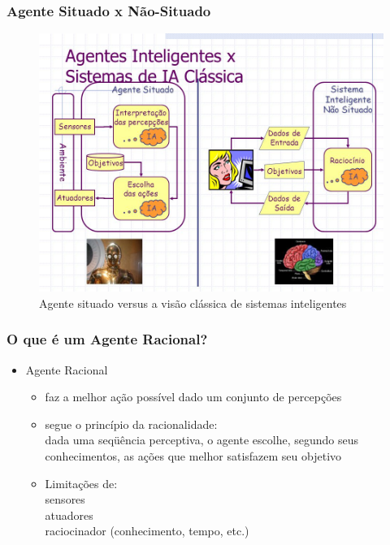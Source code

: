 \begin{frame} %

    \frametitle{Agente Situado x Não-Situado}

    
\begin{figure}[!ht]
\centering
\includegraphics[height =.65\textheight,width=.8\textwidth]{figuras/agente_situado.jpg}
\caption{Agente situado versus a visão clássica de sistemas inteligentes}
\end{figure}

\end{frame}


\begin{frame} %

    \frametitle{O que é um Agente Racional?}

\begin{block}{}
  
 \begin{itemize}
      \item Agente Racional 
 \begin{itemize}
        \item faz a melhor ação possível dado um conjunto de percepções
        \item segue o princípio da racionalidade:\\ 
dada uma seqüência perceptiva, o agente escolhe, segundo seus conhecimentos, 
as ações que melhor satisfazem seu objetivo
      \end{itemize}

\begin{itemize}
  \item Limitações de:\\
  sensores\\
  atuadores\\
  raciocinador (conhecimento, tempo, etc.)
\end{itemize}

    \end{itemize}
  
\end{block}

\end{frame}



